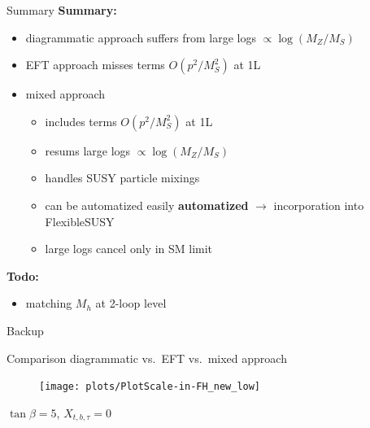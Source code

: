 \documentclass[hyperref={pdfpagelabels=false},ngerman]{beamer}
\newcommand{\eh}[1]{\,\mathsf{#1}}
\renewcommand{\emph}{\textbf}
\begin{document}
\begin{frame}{Summary}
  \emph{Summary:}
  \begin{itemize}
  \item diagrammatic approach suffers from large logs $\propto\log(M_Z/M_S)$
  \item EFT approach misses terms $O(p^2/M_S^2)$ at 1L
  \item mixed approach
    \begin{itemize}
    \item includes terms $O(p^2/M_S^2)$ at 1L
    \item resums large logs $\propto\log(M_Z/M_S)$
    \item handles SUSY particle mixings
    \item can be automatized easily \emph{automatized} $\rightarrow$
      incorporation into FlexibleSUSY
    \item large logs cancel only in SM limit
    \end{itemize}
  \end{itemize}
  \emph{Todo:}
  \begin{itemize}
  \item matching $M_h$ at 2-loop level
  \end{itemize}
\end{frame}


\begin{frame}[noframenumbering]
  \begin{center}
    \Huge Backup
  \end{center}
\end{frame}

\begin{frame}[noframenumbering]{Comparison diagrammatic vs.\ EFT vs.\ mixed approach}
  \begin{figure}
    \centering
    \texttt{[image: plots/PlotScale-in-FH\_new\_low]}
  \end{figure}
  $\tan\beta = 5$, $X_{t,b,\tau} = 0$
\end{frame}

\end{document}
